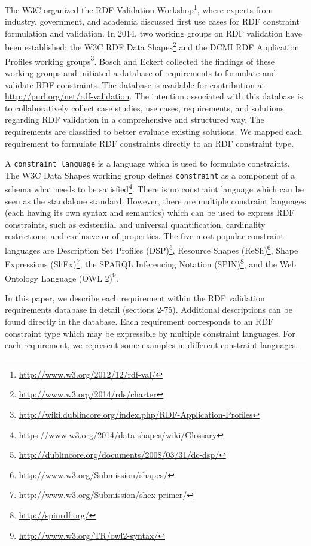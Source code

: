 \documentclass{llncs}
\newcommand{\ms}[1]{\texttt{#1}}
\begin{document}
The W3C organized the RDF Validation Workshop\footnote{\url{http://www.w3.org/2012/12/rdf-val/}}, 
where experts from industry, government, and academia discussed first use cases for RDF constraint formulation and validation.
In 2014, two working groups on RDF validation have been established: 
the W3C RDF Data Shapes\footnote{\url{http://www.w3.org/2014/rds/charter}} and the DCMI RDF Application Profiles working groups\footnote{\url{http://wiki.dublincore.org/index.php/RDF-Application-Profiles}}. 
Bosch and Eckert \cite{BoschEckert2014} collected the findings of these working groups and initiated a database of requirements to formulate and validate RDF constraints.
The database is available for contribution at \url{http://purl.org/net/rdf-validation}.
The intention associated with this database is to collaboratively collect case studies, use cases, requirements, and solutions regarding RDF validation in a comprehensive and structured way. 
The requirements are classified to better evaluate existing solutions. 
We mapped each requirement to formulate RDF constraints directly to an RDF constraint type.

A \ms{constraint language} is a language which is used to formulate constraints.
The W3C Data Shapes working group defines \ms{constraint} as a component of a schema what needs to be satisfied\footnote{\url{https://www.w3.org/2014/data-shapes/wiki/Glossary}}.
There is no constraint language which can be seen as the standalone standard.
However, there are multiple constraint languages (each having its own  syntax and semantics) which can be used to express RDF constraints, such as existential and universal quantification, cardinality restrictions, and exclusive-or of properties.
The five most popular constraint languages are 
Description Set Profiles (DSP)\footnote{\url{http://dublincore.org/documents/2008/03/31/dc-dsp/}},
Resource Shapes (ReSh)\footnote{\url{http://www.w3.org/Submission/shapes/}}, 
Shape Expressions (ShEx)\footnote{\url{http://www.w3.org/Submission/shex-primer/}},
the SPARQL Inferencing Notation (SPIN)\footnote{\url{http://spinrdf.org/}}, 
and the Web Ontology Language (OWL 2)\footnote{\url{http://www.w3.org/TR/owl2-syntax/}}.


In this paper, we describe each requirement within the RDF validation requirements database in detail (sections 2-75).
Additional descriptions can be found directly in the database.
Each requirement corresponds to an RDF constraint type which may be expressible by multiple constraint languages.
For each requirement, we represent some examples in different constraint languages.
\end{document}
